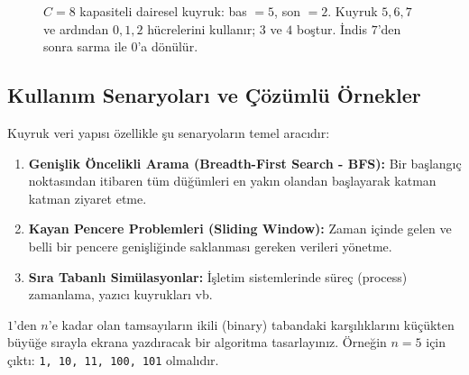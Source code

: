 \begin{figure}[ht]
\centering
{}
\caption{$C = 8$ kapasiteli dairesel kuyruk: bas $= 5$, son $= 2$. Kuyruk
$5, 6, 7$ ve ardından $0, 1, 2$ hücrelerini kullanır; $3$ ve $4$ boştur.
İndis $7$'den sonra sarma ile $0$'a dönülür.}
\end{figure}

\subsection{Kullanım Senaryoları ve Çözümlü Örnekler}

Kuyruk veri yapısı özellikle şu senaryoların temel aracıdır:
\begin{enumerate}
    \item \textbf{Genişlik Öncelikli Arama (Breadth-First Search - BFS):} Bir başlangıç noktasından itibaren tüm düğümleri en yakın olandan başlayarak katman katman ziyaret etme.
    \item \textbf{Kayan Pencere Problemleri (Sliding Window):} Zaman içinde gelen ve belli bir pencere genişliğinde saklanması gereken verileri yönetme.
    \item \textbf{Sıra Tabanlı Simülasyonlar:} İşletim sistemlerinde süreç (process) zamanlama, yazıcı kuyrukları vb.
\end{enumerate}

\begin{example}
$1$'den $n$'e kadar olan tamsayıların ikili (binary) tabandaki karşılıklarını küçükten büyüğe sırayla ekrana yazdıracak bir algoritma tasarlayınız.
Örneğin $n = 5$ için çıktı: \texttt{1, 10, 11, 100, 101} olmalıdır.
\end{example}

